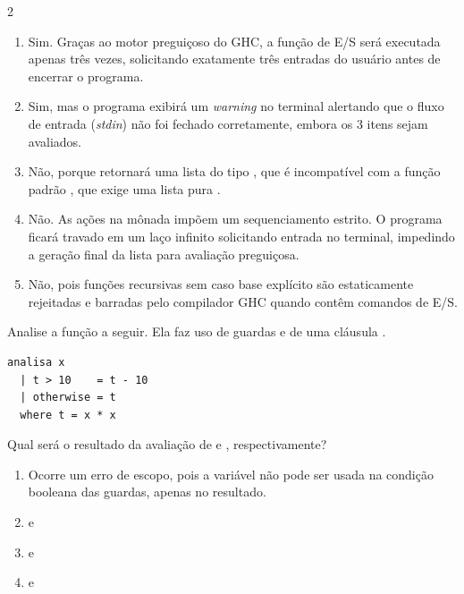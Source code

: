 \documentclass[a4paper,10pt,brazil]{article}
\begin{document}
\begin{multicols}{2}
\begin{enumerate}
  \item Sim. Graças ao motor preguiçoso do GHC, a função de E/S será executada apenas três vezes, solicitando exatamente três entradas do usuário antes de encerrar o programa.

  \item Sim, mas o programa exibirá um \emph{warning} no terminal alertando que o fluxo de entrada (\emph{stdin}) não foi fechado corretamente, embora os 3 itens sejam avaliados.

  \item Não, porque  retornará uma lista do tipo \haskellinline{[IO String]}, que é incompatível com a função padrão , que exige uma lista pura \haskellinline{[a]}.

  \item Não. As ações na mônada  impõem um sequenciamento estrito. O programa ficará travado em um laço infinito solicitando entrada no terminal, impedindo a geração final da lista para avaliação preguiçosa.

  \item Não, pois funções recursivas sem caso base explícito são estaticamente rejeitadas e barradas pelo compilador GHC quando contêm comandos de E/S.


\end{enumerate}

Analise a função a seguir. Ela faz uso de guardas e de uma cláusula .

\begin{verbatim}
analisa x
  | t > 10    = t - 10
  | otherwise = t
  where t = x * x
\end{verbatim}

Qual será o resultado da avaliação de  e , respectivamente?

\begin{enumerate}
  \item Ocorre um erro de escopo, pois a variável  não pode ser usada na condição booleana das guardas, apenas no resultado.

  \item {} e 

  \item {} e 

  \item {} e 


\end{enumerate}
\end{multicols}
\end{document}
